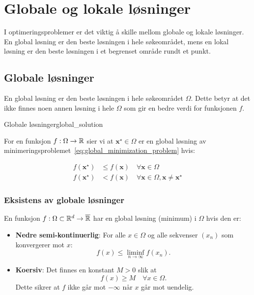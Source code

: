 \section{Globale og lokale løsninger}
\label{sec:global_and_local_solutions}
I optimeringsproblemer er det viktig å skille mellom globale og lokale løsninger. En global løsning er den beste løsningen i hele søkeområdet, mens en lokal løsning er den beste løsningen i et begrenset område rundt et punkt.


\subsection{Globale løsninger}
En global løsning er den beste løsningen i hele søkeområdet \(\Omega\). Dette betyr at det ikke finnes noen annen løsning i hele \(\Omega\) som gir en bedre verdi for funksjonen \(f\).

\begin{definition}{Globale løsninger}{global_solution}

	\medskip
	For en funksjon \(f: \Omega \to \mathbb{R}\) sier vi at \(\symbf{x}^\star \in \Omega\) er en global løsning av minimeringsproblemet~\eqref{eq:global_minimization_problem} hvis:

	\begin{align*}
		f(\symbf{x}^\star) & \leq f(\symbf{x}) \quad \forall \symbf{x} \in \Omega \tag{Global}                                      \\
		f(\symbf{x}^\star) & < f(\symbf{x}) \quad \forall \symbf{x} \in \Omega, \symbf{x} \neq \symbf{x}^\star \tag{Strengt Global}
	\end{align*}
\end{definition}

\subsubsection{Eksistens av globale løsninger}

En funksjon \(f: \Omega \subset \mathbb{R}^d \to \overline{\mathbb{R}}\) har en global løsning (minimum) i \(\Omega\) hvis den er:

\begin{itemize}
	\item \textbf{Nedre semi-kontinuerlig}: For alle \(x \in \Omega\) og alle sekvenser \((x_n)\) som konvergerer mot \(x\):
	      \[
		      f(x) \leq \liminf_{n \to \infty} f(x_n).
	      \]
	\item \textbf{Koersiv}: Det finnes en konstant \(M > 0\) slik at
	      \[
		      f(x) \geq M \quad \forall x \in \Omega.
	      \]
	      Dette sikrer at \(f\) ikke går mot \(-\infty\) når \(x\) går mot uendelig.
\end{itemize}

